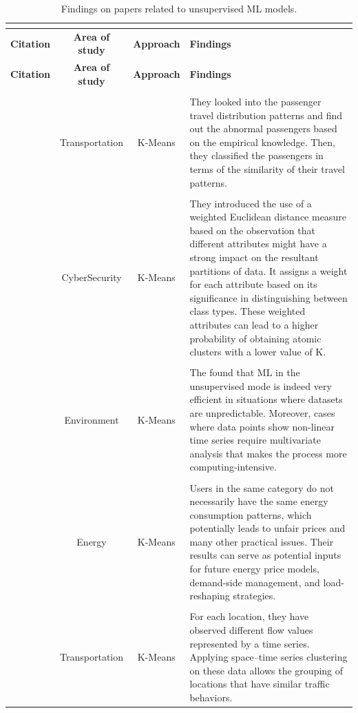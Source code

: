 \documentclass[a4paper,12pt,twoside]{ThesisStyle}
\begin{document}
\renewcommand{\arraystretch}{1.5}
\begin{landscape}
\begin{longtable}{  l  c  c  l  }
\caption{Findings on papers related to unsupervised ML models.}  \\
\label{taula:PUMLM}  \\
 \hline
  \textbf{Citation} & \textbf{Area of study} & \textbf{Approach} & \textbf{Findings}  \\
\hline 
\endfirsthead
 \hline
  \textbf{Citation} & \textbf{Area of study} & \textbf{Approach} & \textbf{Findings}  \\
\hline 
\endhead
\hline
\endfoot
\\
\parbox{0.5cm}{~\cite{Zhao2017passenger}}  & Transportation & K-Means & \parbox{12.5cm}{They looked into the passenger travel distribution patterns and find out the abnormal passengers based on the empirical knowledge. Then, they classified the passengers in terms of the similarity of their travel patterns.} \\
\\
\parbox{1.9cm}{~\cite{al2018semi}}  & CyberSecurity & K-Means & \parbox{12.5cm}{They introduced the use of a weighted Euclidean distance measure based on the observation that different attributes might have a strong impact on the resultant partitions of data. It assigns a weight for each attribute based on its significance in distinguishing between class types. These weighted attributes can lead to a higher probability of obtaining atomic clusters with a lower value of K.} \\
\\
\parbox{2.7cm}{~\cite{mohamudally2018building}}  & Environment & K-Means & \parbox{12.5cm}{The found that ML in the unsupervised mode is indeed very efficient in situations where datasets are unpredictable. Moreover, cases where data points show non-linear time series require multivariate analysis that makes the process more computing-intensive.} \\
\\
\parbox{0.5cm}{~\cite{du2019clustering}}  & Energy & K-Means & \parbox{12.5cm}{Users in the same category do not necessarily have the same energy consumption patterns, which potentially leads to unfair prices and many other practical issues. Their results can serve as potential inputs for future energy price models, demand-side management, and load-reshaping strategies.} \\
\\
\parbox{1.6cm}{~\cite{belhadi2020space}}  & Transportation & K-Means & \parbox{12.5cm}{For each location, they have observed different flow values represented by a time series. Applying space–time series clustering on these data allows the grouping of locations that have similar traffic behaviors. } \\

\end{longtable}
\end{landscape}
\end{document}
